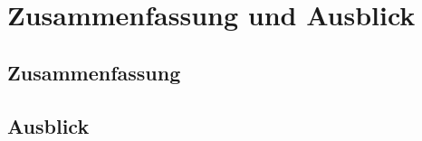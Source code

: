 \chapter{Zusammenfassung und Ausblick}

\section{Zusammenfassung}
\cite{Kornmeier2024}

\section{Ausblick}
